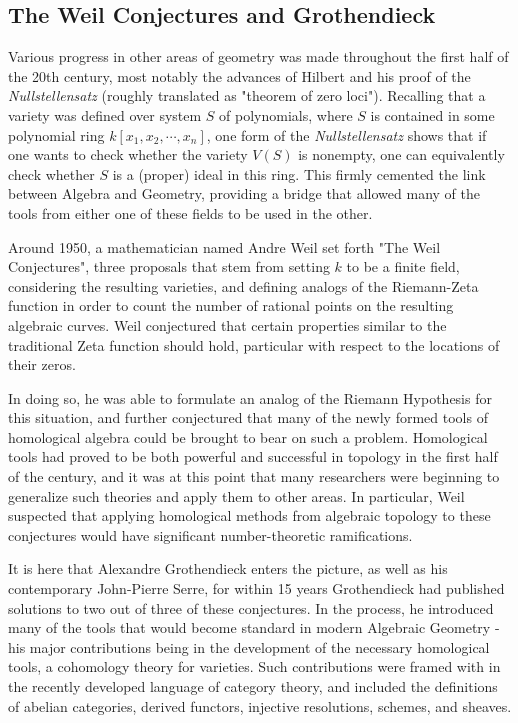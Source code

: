 \documentclass[]{article}
\begin{document}
\subsection{The Weil Conjectures and Grothendieck}\label{header-n127}

Various progress in other areas of geometry was made throughout the
first half of the 20th century, most notably the advances of Hilbert and
his proof of the \emph{Nullstellensatz} (roughly translated as "theorem
of zero loci"). Recalling that a variety was defined over system \(S\)
of polynomials, where \(S\) is contained in some polynomial ring
\(k[x_1, x_2, \cdots, x_n]\), one form of the \emph{Nullstellensatz}
shows that if one wants to check whether the variety \(V(S)\) is
nonempty, one can equivalently check whether \(S\) is a (proper) ideal
in this ring. This firmly cemented the link between Algebra and
Geometry, providing a bridge that allowed many of the tools from either
one of these fields to be used in the other.

Around 1950, a mathematician named Andre Weil set forth "The Weil
Conjectures", three proposals that stem from setting \(k\) to be a
finite field, considering the resulting varieties, and defining analogs
of the Riemann-Zeta function in order to count the number of rational
points on the resulting algebraic curves. Weil conjectured that certain
properties similar to the traditional Zeta function should hold,
particular with respect to the locations of their zeros.

In doing so, he was able to formulate an analog of the Riemann
Hypothesis for this situation, and further conjectured that many of the
newly formed tools of homological algebra could be brought to bear on
such a problem. Homological tools had proved to be both powerful and
successful in topology in the first half of the century, and it was at
this point that many researchers were beginning to generalize such
theories and apply them to other areas. In particular, Weil suspected
that applying homological methods from algebraic topology to these
conjectures would have significant number-theoretic ramifications.

It is here that Alexandre Grothendieck enters the picture, as well as
his contemporary John-Pierre Serre, for within 15 years Grothendieck had
published solutions to two out of three of these conjectures. In the
process, he introduced many of the tools that would become standard in
modern Algebraic Geometry - his major contributions being in the
development of the necessary homological tools, a cohomology theory for
varieties. Such contributions were framed with in the recently developed
language of category theory, and included the definitions of abelian
categories, derived functors, injective resolutions, schemes, and
sheaves.
\end{document}
